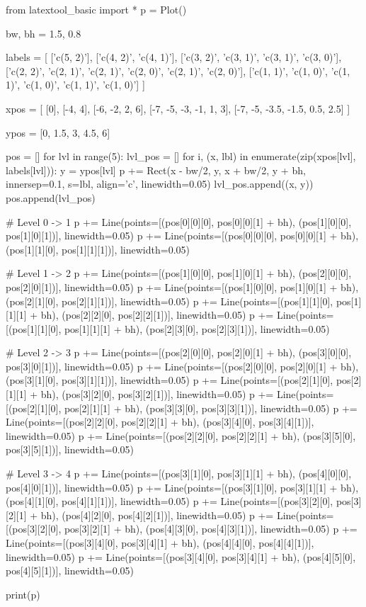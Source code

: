 \begin{python}
from latextool_basic import *
p = Plot()

bw, bh = 1.5, 0.8

labels = [
    ['c(5, 2)'],
    ['c(4, 2)', 'c(4, 1)'],
    ['c(3, 2)', 'c(3, 1)', 'c(3, 1)', 'c(3, 0)'],
    ['c(2, 2)', 'c(2, 1)', 'c(2, 1)', 'c(2, 0)', 'c(2, 1)', 'c(2, 0)'],
    ['c(1, 1)', 'c(1, 0)', 'c(1, 1)', 'c(1, 0)', 'c(1, 1)', 'c(1, 0)']
]

xpos = [
    [0],
    [-4, 4],
    [-6, -2, 2, 6],
    [-7, -5, -3, -1, 1, 3],
    [-7, -5, -3.5, -1.5, 0.5, 2.5]
]

ypos = [0, 1.5, 3, 4.5, 6]

pos = []
for lvl in range(5):
    lvl_pos = []
    for i, (x, lbl) in enumerate(zip(xpos[lvl], labels[lvl])):
        y = ypos[lvl]
        p += Rect(x - bw/2, y, x + bw/2, y + bh, innersep=0.1, s=lbl, align='c', linewidth=0.05)
        lvl_pos.append((x, y))
    pos.append(lvl_pos)

# Level 0 -> 1
p += Line(points=[(pos[0][0][0], pos[0][0][1] + bh), (pos[1][0][0], pos[1][0][1])], linewidth=0.05)
p += Line(points=[(pos[0][0][0], pos[0][0][1] + bh), (pos[1][1][0], pos[1][1][1])], linewidth=0.05)

# Level 1 -> 2
p += Line(points=[(pos[1][0][0], pos[1][0][1] + bh), (pos[2][0][0], pos[2][0][1])], linewidth=0.05)
p += Line(points=[(pos[1][0][0], pos[1][0][1] + bh), (pos[2][1][0], pos[2][1][1])], linewidth=0.05)
p += Line(points=[(pos[1][1][0], pos[1][1][1] + bh), (pos[2][2][0], pos[2][2][1])], linewidth=0.05)
p += Line(points=[(pos[1][1][0], pos[1][1][1] + bh), (pos[2][3][0], pos[2][3][1])], linewidth=0.05)

# Level 2 -> 3 
p += Line(points=[(pos[2][0][0], pos[2][0][1] + bh), (pos[3][0][0], pos[3][0][1])], linewidth=0.05)
p += Line(points=[(pos[2][0][0], pos[2][0][1] + bh), (pos[3][1][0], pos[3][1][1])], linewidth=0.05)
p += Line(points=[(pos[2][1][0], pos[2][1][1] + bh), (pos[3][2][0], pos[3][2][1])], linewidth=0.05)
p += Line(points=[(pos[2][1][0], pos[2][1][1] + bh), (pos[3][3][0], pos[3][3][1])], linewidth=0.05)
p += Line(points=[(pos[2][2][0], pos[2][2][1] + bh), (pos[3][4][0], pos[3][4][1])], linewidth=0.05)
p += Line(points=[(pos[2][2][0], pos[2][2][1] + bh), (pos[3][5][0], pos[3][5][1])], linewidth=0.05)

# Level 3 -> 4 
p += Line(points=[(pos[3][1][0], pos[3][1][1] + bh), (pos[4][0][0], pos[4][0][1])], linewidth=0.05)
p += Line(points=[(pos[3][1][0], pos[3][1][1] + bh), (pos[4][1][0], pos[4][1][1])], linewidth=0.05)
p += Line(points=[(pos[3][2][0], pos[3][2][1] + bh), (pos[4][2][0], pos[4][2][1])], linewidth=0.05)
p += Line(points=[(pos[3][2][0], pos[3][2][1] + bh), (pos[4][3][0], pos[4][3][1])], linewidth=0.05)
p += Line(points=[(pos[3][4][0], pos[3][4][1] + bh), (pos[4][4][0], pos[4][4][1])], linewidth=0.05)
p += Line(points=[(pos[3][4][0], pos[3][4][1] + bh), (pos[4][5][0], pos[4][5][1])], linewidth=0.05)

print(p)
\end{python}

